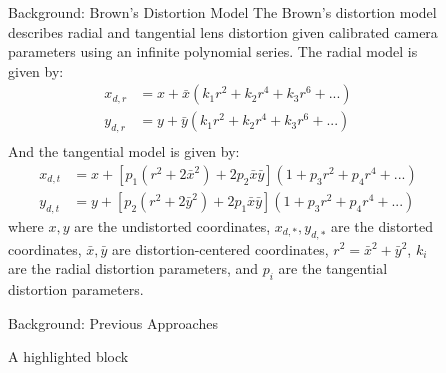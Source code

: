 \documentclass[final]{beamer}
\newlength{\sepwidth}
\newlength{\colwidth}
\newcommand{\separatorcolumn}{\begin{column}{\sepwidth}\end{column}}
\begin{document}
\begin{frame}[t]
  \begin{columns}[t]
    \separatorcolumn

    \begin{column}{\colwidth}



      \begin{block}{Background: Brown's Distortion Model}
        The Brown's distortion model describes radial and tangential lens distortion given calibrated camera parameters using an infinite polynomial series. The radial model is given by:
        \begin{align*}
          x_{d,r} & = x + \bar{x} \left( k_1 r^2 + k_2 r^4 + k_3 r^6 + ... \right) \\
          y_{d,r} & = y + \bar{y} \left( k_1 r^2 + k_2 r^4 + k_3 r^6 + ... \right) \\
        \end{align*}
        And the tangential model is given by:
        \begin{align*}
          x_{d,t} & = x + \left[p_1 (r^2 + 2 \bar{x}^2) + 2 p_2 \bar{x} \bar{y}\right] \left(1 + p_3 r^2 + p_4 r^4 + ...\right) \\
          y_{d,t} & = y + \left[p_2 (r^2 + 2 \bar{y}^2) + 2 p_1 \bar{x} \bar{y}\right]\left(1 + p_3 r^2 + p_4 r^4 + ...\right)
        \end{align*}
        where $x, y$ are the undistorted coordinates, $x_{d,*}, y_{d,*}$ are the distorted coordinates, $\bar{x}, \bar{y}$ are distortion-centered coordinates, $r^2 = \bar{x}^2 + \bar{y}^2$, $k_i$ are the radial distortion parameters, and $p_i$ are the tangential distortion parameters.
      \end{block}

      \begin{block}{Background: Previous Approaches}



      \end{block}

      \begin{alertblock}{A highlighted block}

      \end{alertblock}

    \end{column}

    \separatorcolumn

    \begin{column}{\colwidth}


\end{column}
\end{columns}
\end{frame}
\end{document}
